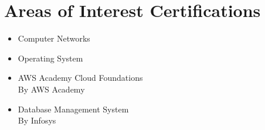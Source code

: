\documentclass[a4paper,11pt]{article}
\begin{document}
\section{\textbf{Areas of Interest \hspace{3cm} Certifications}}
\begin{itemize}[leftmargin=0.05in, label={}]
    \small{\item{
        \begin{minipage}[t]{0.4\textwidth}
            \begin{itemize}[label=\textasteriskcentered]
                \item {Computer Networks}
                \item {Operating System}
            \end{itemize}
        \end{minipage}
        \begin{minipage}[t]{0.55\textwidth}
                \begin{itemize}[label=\textasteriskcentered]
                    \item AWS Academy Cloud Foundations \\
                          By AWS Academy
                    \item Database Management System \\
                          By Infosys
                \end{itemize}
        \end{minipage}
        }}
\end{itemize}
\end{document}
